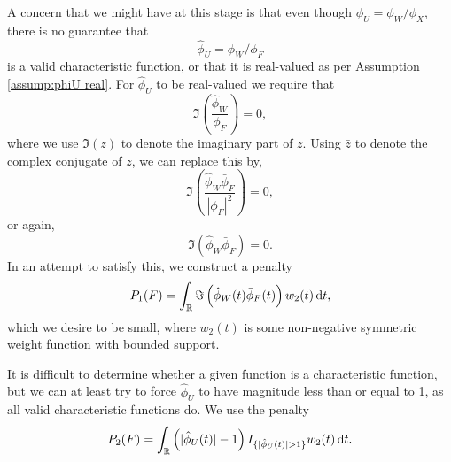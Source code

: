 	A concern that we might have at this stage is that even though $\phi_U = \phi_W / \phi_X$, there is no guarantee that 
	\begin{equation}
		\hat{\phi}_U = \hat{\phi}_W / \phi_{F}
	\end{equation}
	is a valid characteristic function, or that it is real-valued as per Assumption \ref{assump:phiU real}.
	For $\hat{\phi}_U$ to be real-valued we require that
	\begin{equation}
		\Im \left( \frac{\hat{\phi}_W}{\phi_F} \right) = 0,
	\end{equation}
	where we use $\Im(z)$ to denote the imaginary part of $z$. Using $\bar{z}$ to denote the complex conjugate of $z$, we can replace this by,
	\begin{equation}
		\Im \left(\frac{\hat{\phi}_W \bar{\phi}_F}{|\phi_F|^2} \right) = 0,
	\end{equation}
	or again,
	\begin{equation}
		\Im \left(\hat{\phi}_W \bar{\phi}_F\right) = 0.
	\end{equation}
	In an attempt to satisfy this, we construct a penalty
	\begin{align}
		P_1(F) = \int_\mathbb{R} \Im \left(\hat{\phi}_W(t) \bar{\phi}_F(t)\right) w_2(t)\, \mathrm{d} t,
		\label{eq:penalty1}
	\end{align}
	which we desire to be small,
	where $w_2(t)$ is some non-negative symmetric weight function with bounded support.	

	It is difficult to determine whether a given function is a characteristic function, but we can at least try to force $\hat{\phi}_U$ to have magnitude less than or equal to 1, as all valid characteristic functions do. We use the penalty
	\begin{align}
		P_2(F) = \int_\mathbb{R} \left(|\hat{\phi}_U(t)| - 1\right) I_{\{|\hat{\phi}_U(t)| > 1\}}  w_2(t) \, \mathrm{d} t.
		\label{eq:penalty2}
	\end{align} 

